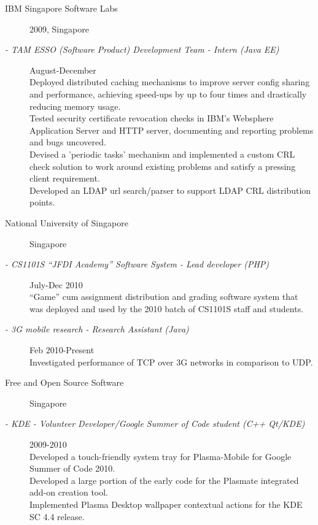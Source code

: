 \documentclass[a4paper]{article}
\begin{document}
\begin{llist}
\vspace{-2ex}
\begin{description}
\item[IBM Singapore Software Labs \ ] \hfill
2009, Singapore
\item[ \textit{ - TAM ESSO (Software Product) Development Team - Intern (Java EE) \hfill } \ ] \hfill
August-December \\
Deployed distributed caching mechanisms to improve server config sharing and
performance, achieving speed-ups by up to four times and drastically reducing memory usage. \\
Tested security certificate revocation checks in IBM's Websphere Application Server and HTTP server, documenting and
reporting problems and bugs uncovered. \\
Devised a 'periodic tasks' mechanism and implemented a custom
CRL check solution to work around existing problems and satisfy a pressing client requirement.\\
Developed an LDAP url search/parser to support LDAP CRL distribution points.\\

\item[National University of Singapore \ ] \hfill
Singapore
\item[ \textit{ - CS1101S ``JFDI Academy'' Software System - Lead developer (PHP) \hfill } \ ] \hfill
July-Dec 2010 \\
``Game'' cum assignment distribution and grading software system that was deployed and used
by the 2010 batch of CS1101S staff and students.
\item[ \textit{ - 3G mobile research - Research Assistant (Java) \hfill } \ ] \hfill
Feb 2010-Present \\
Investigated performance of TCP over 3G networks in comparison to UDP.\\

\item[Free and Open Source Software \ ] \hfill
Singapore
\item[ \textit{ - KDE - Volunteer Developer/Google Summer of Code student (C++ Qt/KDE) }  \ ] \hfill
2009-2010\\
Developed a touch-friendly system tray for Plasma-Mobile for Google Summer of Code 2010.\\
Developed a large portion of the early code for the Plasmate integrated add-on creation tool.\\
Implemented Plasma Desktop wallpaper contextual actions for the KDE SC 4.4 release.


\end{description}
\end{llist}
\end{document}
